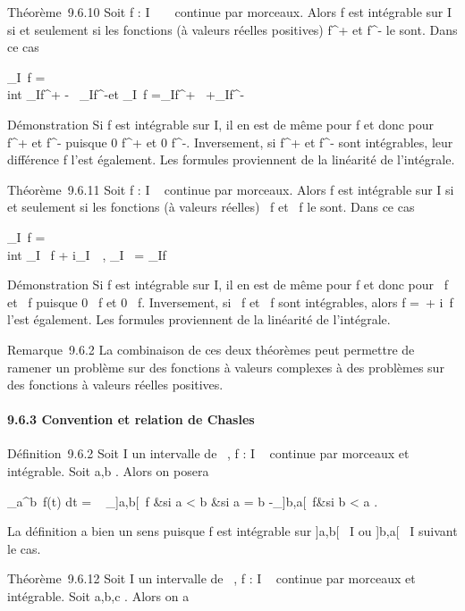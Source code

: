 \documentclass[]{article}
\begin{document}
Théorème~9.6.10 Soit f : I \rightarrow~ ~ continue par morceaux. Alors f est
intégrable sur I si et seulement si les fonctions (à valeurs réelles
positives) f^+ et f^- le sont. Dans ce cas

\int  _I~f =\\int
 _If^+ -\int ~
_If^-\text et
\int  _I~f
=\int  _If^+~
+\int  _If^-~

Démonstration Si f est intégrable sur I, il en est de même pour
f et donc pour f^+ et f^-
puisque 0 \leq f^+ \leqf et 0 \leq
f^-\leqf. Inversement, si f^+ et
f^- sont intégrables, leur différence f l'est également. Les
formules proviennent de la linéarité de l'intégrale.

Théorème~9.6.11 Soit f : I \rightarrow~  continue par morceaux. Alors f est
intégrable sur I si et seulement si les fonctions (à valeurs réelles)
\mathrmRe~f et
\mathrmIm~f le sont. Dans ce
cas

\int  _I~f =\\int
 _I \mathrmRe~f +
i\int  _I~\
\mathrmImf,\quad
\int  _I\overlinef~ =
\overline\int  _If~

Démonstration Si f est intégrable sur I, il en est de même pour
f et donc pour
\mathrmRe~f et
\mathrmIm~f puisque 0
\leq\mathrmRe~f\leqf
et 0
\leq\mathrmIm~f\leqf.
Inversement, si \mathrmRe~f
et \mathrmIm~f sont
intégrables, alors f =\
\mathrmRef +
i\mathrmIm~f l'est
également. Les formules proviennent de la linéarité de l'intégrale.

Remarque~9.6.2 La combinaison de ces deux théorèmes peut permettre de
ramener un problème sur des fonctions à valeurs complexes à des
problèmes sur des fonctions à valeurs réelles positives.

\paragraph{9.6.3 Convention et relation de Chasles}

Définition~9.6.2 Soit I un intervalle de ~, f : I \rightarrow~  continue par
morceaux et intégrable. Soit a,b \in\overlineI. Alors
on posera

\int  _a^b~f(t) dt =
\left \ \cases
\int  _{]}a,b{[}~f &si a \textless{} b
 &si a = b \cr
-\int  _{]}b,a{[}~f&si b \textless{} a
 \right .

La définition a bien un sens puisque f est intégrable sur {]}a,b{[}\subset~ I
ou {]}b,a{[}\subset~ I suivant le cas.

Théorème~9.6.12 Soit I un intervalle de ~, f : I \rightarrow~  continue par
morceaux et intégrable. Soit a,b,c \in\overlineI. Alors
on a
\end{document}

